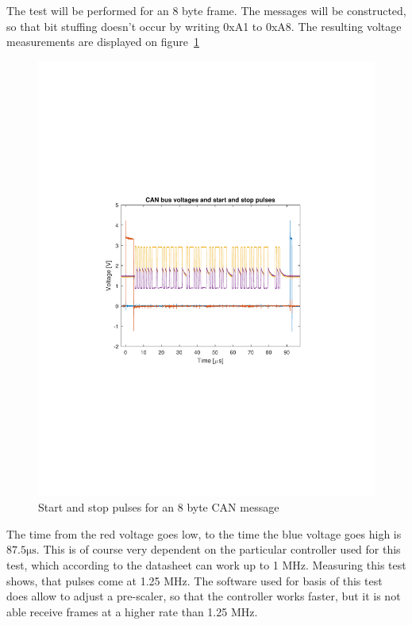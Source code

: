 The test will be performed for an 8 byte frame.
The messages will be constructed, so that bit stuffing doesn't occur by writing 0xA1 to 0xA8. 
The resulting voltage measurements are displayed on figure~\ref{fig:CAN_test1_raw}

\begin{figure}[h]
	\centering
	\includegraphics[width = \linewidth]{graphics/CAN_test1_raw}
	\caption{Start and stop pulses for an 8 byte CAN message}
	\label{fig:CAN_test1_raw}
\end{figure}

The time from the red voltage goes low, to the time the blue voltage goes high is $87.5 \si{\micro\second}$.
This is of course very dependent on the particular controller used for this test, which according to the datasheet can work up to 1 MHz.
Measuring this test shows, that pulses come at 1.25 MHz.
The software used for basis of this test does allow to adjust a pre-scaler, so that the controller works faster, but it is not able receive frames at a higher rate than 1.25 MHz.\\

